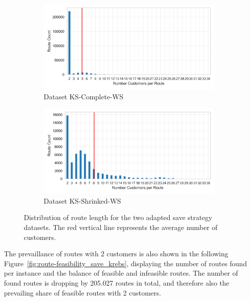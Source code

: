 \begin{figure}[ht]
	\centering
	\begin{subfigure}[t]{.5\textwidth}
		\centering
		\includegraphics[width=\linewidth]{pictures/dataset_structure/no_cust_plot_krebs_28880_600_WS.png}
		\caption{Dataset KS-Complete-WS}
		\label{fig:ds-a-krebs}
	\end{subfigure}%
	\begin{subfigure}[t]{.5\textwidth}
		\centering
		\includegraphics[width=\linewidth]{pictures/dataset_structure/no_cust_plot_krebs_28880_600_WS_shrinked094.png}
		\caption{Dataset KS-Shrinked-WS}
		\label{fig:ds-b-krebs}
	\end{subfigure}
	\caption{Distribution of route length for the two adapted save strategy datasets. The red vertical line represents the average
		number of customers.}
	\label{fig:route-dists_save_krebs}
\end{figure}

The prevaillance of routes with 2 customers is also shown in the following Figure~\ref{fig:route-feasibility_save_krebs}, displaying the number of routes found per instance and
the balance of feasible and infeasible routes. The number of found routes is dropping by 205.027 routes in total, and therefore
also the prevailing share of feasible routes with 2 customers.

